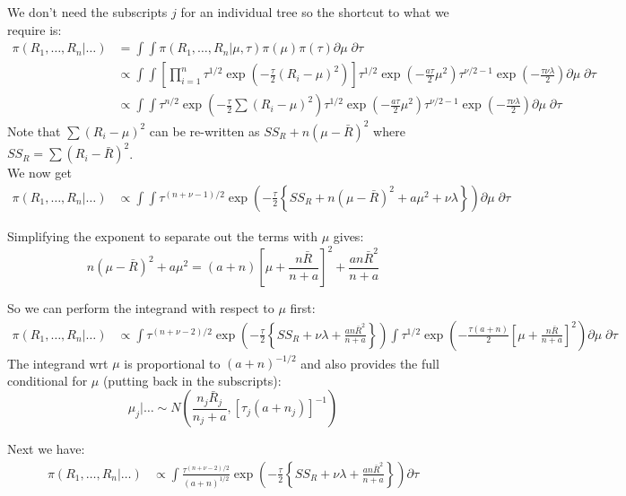 \documentclass{article}
\begin{document}
We don't need the subscripts $j$ for an individual tree so the shortcut to what we require is:
\begin{align*}
\pi(R_1, \ldots, R_n| \ldots ) &= \int \int \pi(R_1, \ldots, R_n| \mu, \tau) \pi(\mu) \pi(\tau) \partial \mu \; \partial \tau \\
&\propto \int \int \left[ \prod_{i=1}^n \tau^{1/2} \exp \left(-\frac{\tau}{2} (R_i - \mu)^2 \right) \right]\tau^{1/2} \exp \left(-\frac{a \tau}{2} \mu^2 \right) \tau^{\nu/2 - 1} \exp \left( - \frac{\tau \nu \lambda} {2} \right) \partial \mu \; \partial \tau \\
&\propto \int \int \tau^{n/2} \exp \left(-\frac{\tau}{2} \sum (R_i - \mu)^2 \right) \tau^{1/2} \exp \left(-\frac{a \tau}{2} \mu^2 \right) \tau^{\nu/2 - 1} \exp \left( - \frac{\tau \nu \lambda} {2} \right) \partial \mu \; \partial \tau 
\end{align*}
Note that $\sum (R_i - \mu)^2$ can be re-written as $SS_{R} + n(\mu - \bar{R})^2$ where $SS_R = \sum (R_i - \bar{R})^2$.\\

We now get
\begin{align*}
\pi(R_1, \ldots, R_n| \ldots ) &\propto \int \int  \tau^{(n+\nu - 1)/2} \exp \left(-\frac{\tau}{2} \left\{ SS_{R} + n(\mu - \bar{R})^2  + a \mu^2 + \nu \lambda \right\} \right) \partial \mu \; \partial \tau
\end{align*}

Simplifying the exponent to separate out the terms with $\mu$ gives:
$$n(\mu - \bar{R})^2 + a \mu^2 = (a+n)\left[ \mu + \frac{n\bar{R}}{n + a} \right]^2 + \frac{a n\bar{R}^2}{n + a}$$

So we can perform the integrand with respect to $\mu$ first:
\begin{align*}
\pi(R_1, \ldots, R_n| \ldots ) &\propto  \int  \tau^{(n+\nu - 2)/2} \exp \left(-\frac{\tau}{2} \left\{ SS_{R} + \nu \lambda + \frac{an\bar{R}^2}{n + a} \right\} \right) \int \tau^{1/2} \exp \left(-\frac{\tau (a+n)}{2} \left[ \mu + \frac{n\bar{R}}{n + a} \right]^2  \right) \partial \mu \; \partial \tau
\end{align*}
The integrand wrt $\mu$ is proportional to $(a + n)^{-1/2}$ and also provides the full conditional for $\mu$ (putting back in the subscripts):
$$\mu_j |\ldots \sim N \left( \frac{n_j\bar{R}_j}{n_j + a} , \left[ \tau_j (a+n_j) \right]^{-1} \right)$$

Next we have: 
\begin{align*}
\pi(R_1, \ldots, R_n| \ldots ) &\propto  \int  \frac{\tau^{(n+\nu - 2)/2}}{(a+n)^{1/2}} \exp \left(-\frac{\tau}{2} \left\{ SS_{R} + \nu \lambda + \frac{an\bar{R}^2}{n + a} \right\} \right)  \partial \tau
\end{align*}
\end{document}
